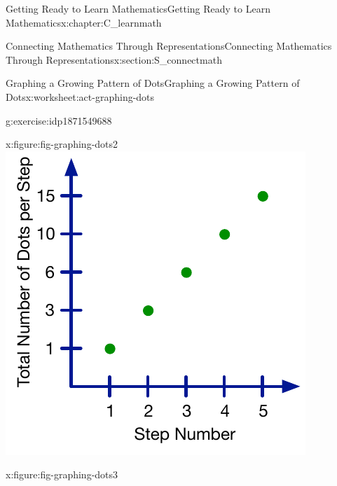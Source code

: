 \documentclass[oneside,10pt,]{book}
\numberwithin{equation}{chapter}
\begin{document}
\begin{chapterptx}{Getting Ready to Learn Mathematics}{}{Getting Ready to Learn Mathematics}{}{}{x:chapter:C_learnmath}
\begin{sectionptx}{Connecting Mathematics Through Representations}{}{Connecting Mathematics Through Representations}{}{}{x:section:S_connectmath}
\begin{worksheet-subsection}{Graphing a Growing Pattern of Dots}{}{Graphing a Growing Pattern of Dots}{}{}{x:worksheet:act-graphing-dots}
\begin{divisionexercise}{1}{}{}{g:exercise:idp1871549688}
\begin{sidebyside}{4}{0}{0}{0}
\begin{sbspanel}{0.25}
\begin{figureptx}{}{x:figure:fig-graphing-dots2}{}
\includegraphics[width=\linewidth]{external/graphing-dots2.pdf}
\tcblower
\end{figureptx}%
\end{sbspanel}%
\begin{sbspanel}{0.25}%
\begin{figureptx}{}{x:figure:fig-graphing-dots3}{}%

\end{figureptx}
\end{sbspanel}
\end{sidebyside}
\end{divisionexercise}
\end{worksheet-subsection}
\end{sectionptx}
\end{chapterptx}
\end{document}
